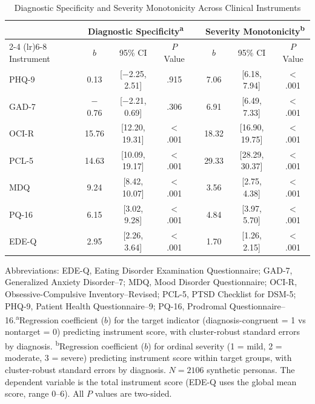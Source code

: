 \documentclass[12pt]{article}
\begin{document}

\begin{table}[ht]
\caption{Diagnostic Specificity and Severity Monotonicity Across Clinical Instruments}
\label{tab:main-effects}
\centering
\small
\begin{tabular}{lccccccc}
\toprule
 & \multicolumn{3}{c}{Diagnostic Specificity\textsuperscript{a}} & & \multicolumn{3}{c}{Severity Monotonicity\textsuperscript{b}} \\
\cmidrule(lr){2-4} \cmidrule(lr){6-8}
Instrument & $b$ & 95\% CI & $P$ Value & & $b$ & 95\% CI & $P$ Value \\
\midrule
PHQ-9  & 0.13  & [$-$2.25, 2.51]  & .915 & & 7.06  & [6.18, 7.94]  & $<$.001 \\
GAD-7  & $-$0.76 & [$-$2.21, 0.69] & .306 & & 6.91  & [6.49, 7.33]  & $<$.001 \\
OCI-R  & 15.76 & [12.20, 19.31]  & $<$.001 & & 18.32 & [16.90, 19.75] & $<$.001 \\
PCL-5  & 14.63 & [10.09, 19.17]  & $<$.001 & & 29.33 & [28.29, 30.37] & $<$.001 \\
MDQ    & 9.24  & [8.42, 10.07]   & $<$.001 & & 3.56  & [2.75, 4.38]  & $<$.001 \\
PQ-16  & 6.15  & [3.02, 9.28]    & $<$.001 & & 4.84  & [3.97, 5.70]  & $<$.001 \\
EDE-Q  & 2.95  & [2.26, 3.64]    & $<$.001 & & 1.70  & [1.26, 2.15]  & $<$.001 \\
\bottomrule
\end{tabular}
\begin{flushleft}
\footnotesize
Abbreviations: EDE-Q, Eating Disorder Examination Questionnaire; GAD-7, Generalized Anxiety Disorder--7; MDQ, Mood Disorder Questionnaire; OCI-R, Obsessive-Compulsive Inventory--Revised; PCL-5, PTSD Checklist for DSM-5; PHQ-9, Patient Health Questionnaire--9; PQ-16, Prodromal Questionnaire--16.\textsuperscript{a}Regression coefficient ($b$) for the target indicator (diagnosis-congruent = 1 vs nontarget = 0) predicting instrument score, with cluster-robust standard errors by diagnosis.
\textsuperscript{b}Regression coefficient ($b$) for ordinal severity (1 = mild, 2 = moderate, 3 = severe) predicting instrument score within target groups, with cluster-robust standard errors by diagnosis. $N = 2106$ synthetic personas. The dependent variable is the total instrument score (EDE-Q uses the global mean score, range 0--6). All $P$ values are two-sided.
\end{flushleft}
\end{table}
\end{document}

